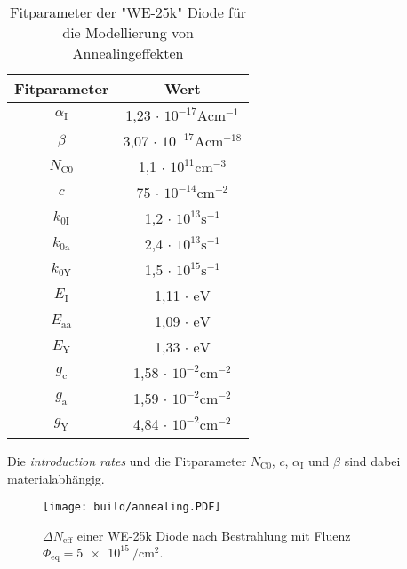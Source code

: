 \begin{table}
  \centering
  \caption{Fitparameter der "WE-25k" Diode für die Modellierung von Annealingeffekten }
  \label{tab:w1}
  \begin{tabular}{c c}
    \toprule
    Fitparameter & Wert  \\
    \midrule
        $\alpha_{\mathrm{I}}$  &    1,23 $\cdot$ $  10^{-17}        \mathrm{Acm^{-1}}$    \\
        $\beta $               &    3,07 $\cdot$ $10^{-17}          \mathrm{Acm^{-18}}$     \\
        $N_{\mathrm{C0}}$             &    1,1  $\cdot$            $10^{11}\mathrm{cm^{-3}}$   \\
        $c$                          &    75   $\cdot$             $10^{-14}\mathrm{cm^{-2}}$    \\
        $k_{0\mathrm{I}}$            &    1,2  $\cdot$             $10^{13}\mathrm{s^{-1}}$\\
        $k_{0\mathrm{a}}$           &    2,4  $\cdot$              $10^{13}\mathrm{s^{-1}}$   \\
        $k_{0\mathrm{Y}}$            &    1,5  $\cdot$             $10^{15}\mathrm{s^{-1}}$     \\
        $E_{\mathrm{I}}$                       &    1,11 $\cdot$   $\mathrm{eV}$       \\
        $E_{\mathrm{aa}}$                     &    1,09 $\cdot$    $\mathrm{eV}$       \\
        $E_{\mathrm{Y}}$                      &    1,33 $\cdot$    $\mathrm{eV}$    \\
        $g_{\mathrm{c}}$      &    1,58 $\cdot$                    $10^{-2}\mathrm{cm^{-2}}$           \\
        $g_{\mathrm{a}}$           &    1,59 $\cdot$               $10^{-2}\mathrm{cm^{-2}}$         \\
        $g_{\mathrm{Y}}$          &    4,84 $\cdot$                $10^{-2}\mathrm{cm^{-2}}$      \\
    \bottomrule
  \end{tabular}
\end{table}
Die \textit{introduction rates} und die Fitparameter $N_{\mathrm{C0}}$, $c$, $\alpha_{\mathrm{I}}$ und $\beta $ sind dabei materialabhängig.

\begin{figure}
    \texttt{[image: build/annealing.PDF]}
    \caption{$\Delta N_{\mathrm{eff}}$ einer WE-25k Diode nach Bestrahlung mit Fluenz $\Phi_{\mathrm{eq}} = \SI{5e15}{\per\centi\meter\squared}.$}
    \label{fig:N_eff}
\end{figure}

